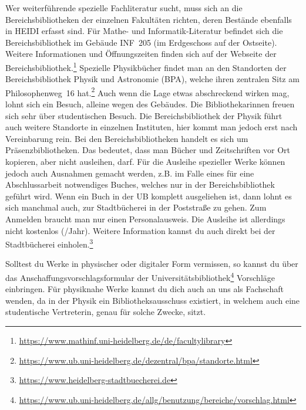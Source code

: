 Wer weiterführende spezielle Fachliteratur sucht, muss sich an die Bereichsbibliotheken der einzelnen Fakultäten richten, deren Bestände ebenfalls in \gls{HEIDI} erfasst sind. Für Mathe- und Informatik-Literatur befindet sich die Bereichsbibliothek im Gebäude \gls{INF}~205 (im Erdgeschoss auf der Ostseite). Weitere Informationen und Öffnungszeiten finden sich auf der Webseite der Bereichsbibliothek.\footnote{\url{https://www.mathinf.uni-heidelberg.de/de/facultylibrary}} Spezielle Physikbücher findet man an den Standorten der Bereichsbibliothek Physik und Astronomie (BPA), welche ihren zentralen Sitz am Philosophenweg~16 hat.\footnote{\url{https://www.ub.uni-heidelberg.de/dezentral/bpa/standorte.html}} Auch wenn die Lage etwas abschreckend wirken mag, lohnt sich ein Besuch, alleine wegen des Gebäudes. Die Bibliothekarinnen freuen sich sehr über studentischen Besuch. Die Bereichsbibliothek der Physik führt auch weitere Standorte in einzelnen Instituten, hier kommt man jedoch erst nach Vereinbarung rein.
Bei den Bereichsbibliotheken handelt es sich um Präsenzbibliotheken. Das bedeutet, dass man Bücher und Zeitschriften vor Ort kopieren, aber nicht ausleihen, darf. Für die Ausleihe spezieller Werke können jedoch auch Ausnahmen gemacht werden, z.B. im Falle eines für eine Abschlussarbeit notwendiges Buches, welches nur in der Bereichsbibliothek geführt wird.
Wenn ein Buch in der UB komplett ausgeliehen ist, dann lohnt es sich manchmal auch, zur Stadtbücherei in der Poststraße zu gehen. Zum Anmelden braucht man nur einen Personalausweis. Die Ausleihe ist allerdings nicht kostenlos (/Jahr). Weitere Information kannst du auch direkt bei der Stadtbücherei einholen.\footnote{\url{https://www.heidelberg-stadtbuecherei.de}}

Solltest du Werke in physischer oder digitaler Form vermissen, so kannst du über das Anschaffungsvorschlagsformular der Universitätsbibliothek\footnote{\url{https://www.ub.uni-heidelberg.de/allg/benutzung/bereiche/vorschlag.html}} Vorschläge einbringen. Für physiknahe Werke kannst du dich auch an uns als Fachschaft wenden, da in der Physik ein Bibliotheksausschuss existiert, in welchem auch eine studentische Vertreterin, genau für solche Zwecke, sitzt.



%
